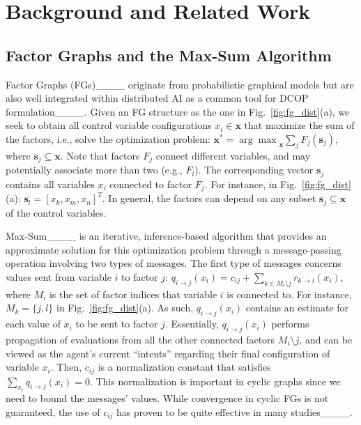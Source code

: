 \section{Background and Related Work}
\label{sec:back_rw}
    

\subsection{Factor Graphs and the Max-Sum Algorithm}
    
Factor Graphs (FGs)____ originate from probabilistic graphical models but are also well integrated within distributed AI as a common tool for DCOP formulation____.
Given an FG structure as the one in Fig.~\ref{fig:fg_dist}(a), we seek to obtain all control variable configurations $x_i \in \mathbf{x}$ that maximize the sum of the factors, i.e., solve the optimization problem: $\mathbf{x}^*={\arg\max}_{\mathbf{x}}\sum_j F_j(\mathbf{s}_j)$, where $\mathbf{s}_j \subseteq \mathbf{x}$.
Note that factors $F_j$ connect different variables, and may potentially associate more than two (e.g., $F_l$).
The corresponding vector $\mathbf{s}_j$ contains all variables $x_i$ connected to factor $F_j$.
For instance, in Fig.~\ref{fig:fg_dist}(a): $\mathbf{s}_l=[x_k,x_m,x_n]^T$.
In general, the factors can depend on any subset $\mathbf{s}_j \subseteq \mathbf{x}$ of the control variables.


Max-Sum____ is an iterative, inference-based algorithm that provides an approximate solution for this optimization problem through
a message-passing operation involving two types of messages.
The first type of messages concerns values sent from variable $i$ to factor $j$:
$q_{i \rightarrow j}(x_i) = c_{ij} + \sum_{k \in M_i \setminus j} r_{k \rightarrow i}(x_i)$, where $M_i$ is the set of factor indices that variable $i$ is connected to. 
For instance, $M_k=\{j,l\}$ in Fig.~\ref{fig:fg_dist}(a). 
As such, $q_{i \rightarrow j}(x_i)$ contains an estimate for each value of $x_i$ to be sent to factor $j$.
Essentially, $q_{i \rightarrow j}(x_i)$ performs propagation of evaluations from all the other connected factors $M_i \setminus j$,
and can be viewed as the agent's current ``intents'' regarding their final configuration of variable $x_i$.
Then, $c_{ij}$ is a normalization constant that satisfies $\sum_{x_i}q_{i \rightarrow j}(x_i)=0$.
This normalization is important in cyclic graphs since we need to bound the messages' values. 
While convergence in cyclic FGs is not guaranteed, the use of $c_{ij}$ has proven to be quite effective in many studies____.

